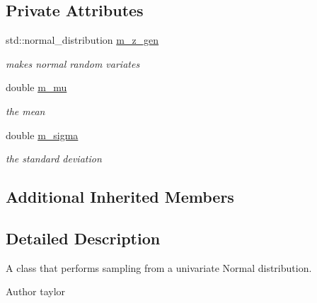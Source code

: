 \subsection*{Private Attributes}
\begin{DoxyCompactItemize}
\item 
std\+::normal\+\_\+distribution \hyperlink{classpf_1_1UnivNormSampler_a4a8afd473ade0394b9361734743ef055}{m\+\_\+z\+\_\+gen}\hypertarget{classpf_1_1UnivNormSampler_a4a8afd473ade0394b9361734743ef055}{}\label{classpf_1_1UnivNormSampler_a4a8afd473ade0394b9361734743ef055}

\begin{DoxyCompactList}\small\item\em makes normal random variates \end{DoxyCompactList}\item 
double \hyperlink{classpf_1_1UnivNormSampler_ababec984e114e54477cbcb7ee2e87841}{m\+\_\+mu}\hypertarget{classpf_1_1UnivNormSampler_ababec984e114e54477cbcb7ee2e87841}{}\label{classpf_1_1UnivNormSampler_ababec984e114e54477cbcb7ee2e87841}

\begin{DoxyCompactList}\small\item\em the mean \end{DoxyCompactList}\item 
double \hyperlink{classpf_1_1UnivNormSampler_a1d62e630ea2386b04495dec9dce2ed95}{m\+\_\+sigma}\hypertarget{classpf_1_1UnivNormSampler_a1d62e630ea2386b04495dec9dce2ed95}{}\label{classpf_1_1UnivNormSampler_a1d62e630ea2386b04495dec9dce2ed95}

\begin{DoxyCompactList}\small\item\em the standard deviation \end{DoxyCompactList}\end{DoxyCompactItemize}
\subsection*{Additional Inherited Members}


\subsection{Detailed Description}
A class that performs sampling from a univariate Normal distribution. 

\begin{DoxyAuthor}{Author}
taylor 
\end{DoxyAuthor}


